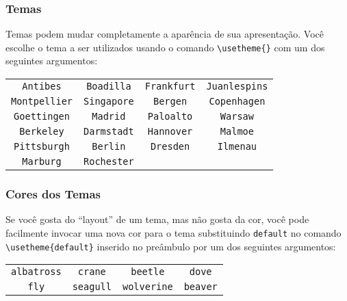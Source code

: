 \begin{frame}[fragile]
\frametitle{Temas}
Temas podem mudar completamente a aparência de sua apresentação. Você escolhe o tema a ser
utilizados usando o comando \verb|\usetheme{}| com um dos seguintes argumentos:

\begin{block}{}
\centering
\begin{tabular}{cccc}
\small
\texttt{Antibes} & \texttt{Boadilla} & \texttt{Frankfurt} & \texttt{Juanlespins} \\
\texttt{Montpellier} & \texttt{Singapore} & \texttt{Bergen} & \texttt{Copenhagen} \\
\texttt{Goettingen} & \texttt{Madrid} & \texttt{Paloalto} & \texttt{Warsaw} \\
\texttt{Berkeley} & \texttt{Darmstadt} & \texttt{Hannover} & \texttt{Malmoe} \\
\texttt{Pittsburgh} & \texttt{Berlin} & \texttt{Dresden} & \texttt{Ilmenau} \\
\texttt{Marburg} & \texttt{Rochester} & & \\
\end{tabular}
\end{block}

\end{frame}


\begin{frame}[fragile]
\frametitle{Cores dos Temas}
Se você gosta do ``layout'' de um tema, mas não gosta da cor, você pode facilmente invocar uma nova
cor para o tema substituindo \texttt{default} no comando \verb|\usetheme{default}| inserido no
preâmbulo por um dos seguintes argumentos:

\begin{block}{}
\centering
\begin{tabular}{cccc}
\small
\texttt{albatross} & \texttt{crane} & \texttt{beetle} & \texttt{dove} \\
\texttt{fly} & \texttt{seagull} & \texttt{wolverine} & \texttt{beaver} \\
\end{tabular}
\end{block}

\end{frame}



